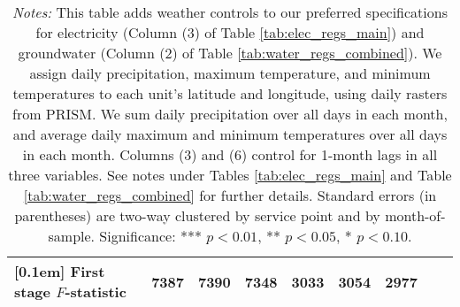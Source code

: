\begin{table}[t!]
\begin{adjustbox}{center}
\begin{tabular}{lcccccccc}
[0.1em] 
First stage $F$-statistic & 7387 & 7390 & 7348 & 3033 & 3054 & 2977   \\ 
[0.15em]
\hline
\end{tabular}
\end{adjustbox}
\captionsetup{width=\textwidth}
\caption*{\scriptsize \emph{Notes:} This table adds weather controls to our preferred specifications for electricity 
(Column (3) of Table \ref{tab:elec_regs_main}) and groundwater (Column (2) of Table \ref{tab:water_regs_combined}). 
We assign daily precipitation, maximum temperature, and minimum temperatures to each unit's latitude and longitude, 
using daily rasters from PRISM. We sum daily precipitation over all days in each month, and average daily maximum  
and minimum temperatures over all days in each month. Columns (3) and (6) control for 1-month lags in all three variables. 
See notes under Tables \ref{tab:elec_regs_main} and  Table \ref{tab:water_regs_combined} for further details. 
Standard errors (in parentheses) are two-way clustered by service point and by month-of-sample.
Significance: *** $p < 0.01$, ** $p < 0.05$, * $p < 0.10$.
}
\end{table}
